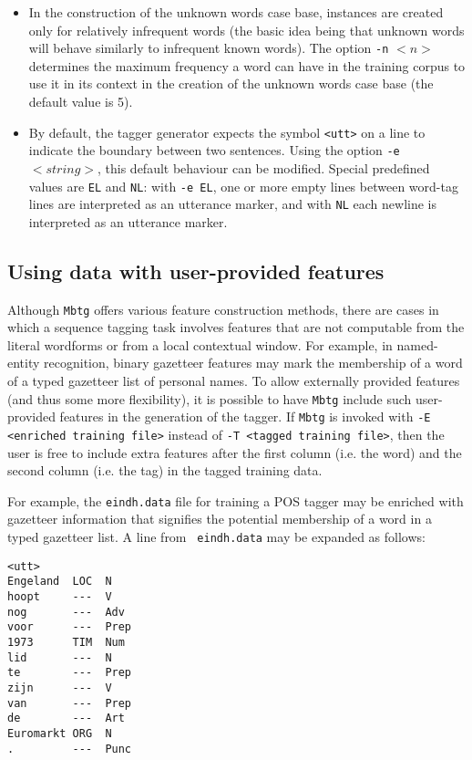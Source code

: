 \documentclass{report}
\begin{document}
\begin{itemize}
\item In the construction of the unknown words case base, instances
  are created only for relatively infrequent words
  (the basic idea being that unknown words will behave similarly to
  infrequent known words).  The option {\tt -n} $<n>$ determines the
  maximum frequency a word can have in the training corpus to use it
  in its context in the creation of the unknown words case base
  (the default value is 5).
\item By default, the tagger generator expects the symbol {\tt <utt>}
  on a line to indicate the boundary between two sentences.  Using the
  option {\tt -e} $<string>$, this default behaviour can be
  modified. Special predefined values are {\tt EL} and {\tt NL}: with
  {\tt -e EL}, one or more empty lines between word-tag lines are
  interpreted as an utterance marker, and with {\tt NL} each newline
  is interpreted as an utterance marker.
\end{itemize}

\subsection{Using data with user-provided features}
\label{userprovided-mbtg}

Although {\tt Mbtg} offers various feature construction methods, there
are cases in which a sequence tagging task involves features that are
not computable from the literal wordforms or from a local contextual
window. For example, in named-entity recognition, binary gazetteer
features may mark the membership of a word of a typed gazetteer list
of personal names. To allow externally provided features (and thus
some more flexibility), it is possible to have {\tt Mbtg} include such
user-provided features in the generation of the tagger. If {\tt Mbtg}
is invoked with {\tt -E <enriched training file>} instead of {\tt -T
  <tagged training file>}, then the user is free to include extra
features after the first column (i.e. the word) and the second column
(i.e. the tag) in the tagged training data.

For example, the {\tt eindh.data} file for training a POS tagger may
be enriched with gazetteer information that signifies the potential
membership of a word in a typed gazetteer list. A line from {\tt
  eindh.data} may be expanded as follows:

{\small
\begin{verbatim}
<utt>
Engeland  LOC  N
hoopt     ---  V
nog       ---  Adv
voor      ---  Prep
1973      TIM  Num
lid       ---  N
te        ---  Prep
zijn      ---  V
van       ---  Prep
de        ---  Art
Euromarkt ORG  N
.         ---  Punc
\end{verbatim}
}
\end{document}
